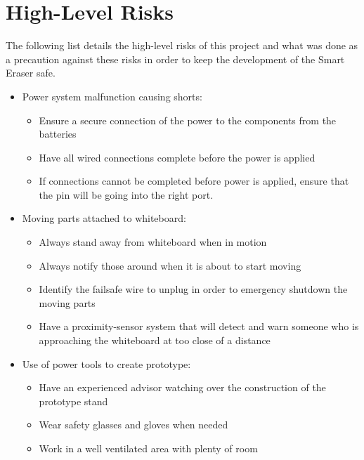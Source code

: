 \section{High-Level Risks}
The following list details the high-level risks of this project and what was done as a precaution against these risks in order to keep the development of the Smart Eraser safe.
\begin{itemize}
	\item Power system malfunction causing shorts:
		\begin{itemize}
		\item Ensure a secure connection of the power to the components from the batteries
		\item Have all wired connections complete before the power is applied
		\item If connections cannot be completed before power is applied, ensure that the pin will be going into the right port.
		\end{itemize}
	\item Moving parts attached to whiteboard:
		\begin{itemize}
		\item Always stand away from whiteboard when in motion
		\item Always notify those around when it is about to start moving
		\item Identify the failsafe wire to unplug in order to emergency shutdown the moving parts
		\item Have a proximity-sensor system that will detect and warn someone who is approaching the whiteboard at too close of a distance
		\end{itemize}
	\item Use of power tools to create prototype:
		\begin{itemize}
		\item Have an experienced advisor watching over the construction of the prototype stand
		\item Wear safety glasses and gloves when needed
		\item Work in a well ventilated area with plenty of room
		\end{itemize}
\end{itemize}

